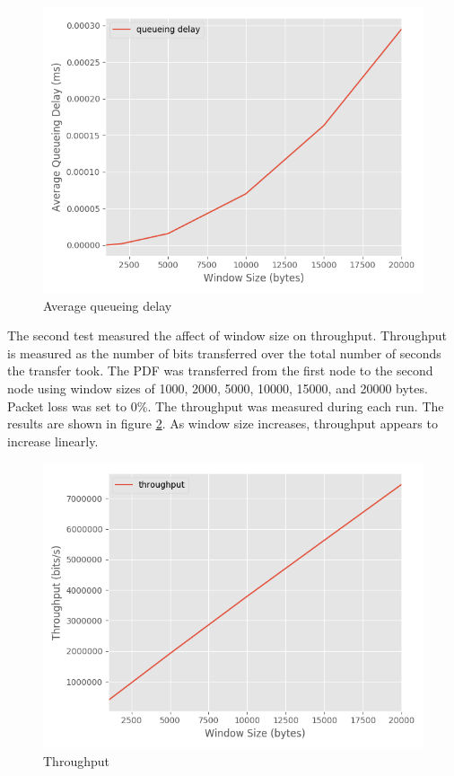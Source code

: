 \documentclass[fleqn,11pt]{article}
\begin{document}
\begin{figure}[!htb]
  \centering
  \includegraphics[width=13cm]{queueing.png}
  \caption{Average queueing delay}
  \label{fig:queueing}
\end{figure}

\newpage

The second test measured the affect of window size on throughput. Throughput is
measured as the number of bits transferred over the total number of seconds the
transfer took. The PDF was transferred from the first node to the second node
using window sizes of 1000, 2000, 5000, 10000, 15000, and 20000 bytes. Packet
loss was set to 0\%. The throughput was measured during each run.  The results
are shown in figure \ref{fig:throughput}. As window size increases, throughput appears
to increase linearly.

\begin{figure}[!htb]
  \centering
  \includegraphics[width=13cm]{throughput.png}
  \caption{Throughput}
  \label{fig:throughput}
\end{figure}
\end{document}
